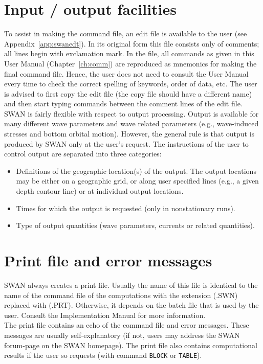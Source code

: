 \documentclass[12pt]{book}
\begin{document}
\section{Input / output facilities}
To assist in making the command file, an edit file is available to the user (see Appendix~\ref{app:swanedt}). In its original
form this file consists only of comments; all lines begin with exclamation mark. In the file, all commands
as given in this User Manual (Chapter~\ref{ch:comm}) are reproduced as mnemonics for making the final command
file. Hence, the user does not need to consult the User Manual every time to check the correct spelling
of keywords, order of data, etc. The user is advised to first copy the edit file (the copy file should have a
different name) and then start typing commands between the comment lines of the edit file.
\\[2ex]
\noindent
SWAN is fairly flexible with respect to output processing. Output is available for many different wave
parameters and wave related parameters (e.g., wave-induced stresses and bottom orbital motion).
However, the general rule is that output is produced by SWAN only at the user's request. The instructions
of the user to control output are separated into three categories:
\begin{itemize}
  \item Definitions of the geographic location(s) of the output. The output locations may be either on a
        geographic grid, or along user specified lines (e.g., a given depth contour line) or at
        individual output locations.
  \item Times for which the output is requested (only in nonstationary runs).
  \item Type of output quantities (wave parameters, currents or related quantities).
\end{itemize}

\section{Print file and error messages}
\label{sec:prtfile}
SWAN always creates a print file. Usually the name of this file is identical to the name of the command
file of the computations with the extension (.SWN) replaced with (.PRT). Otherwise, it depends on the
batch file that is used by the user. Consult the Implementation Manual for more information.
\\[2ex]
\noindent
The print file contains an echo of the command file and error messages. These messages are usually
self-explanatory (if not, users may address the SWAN forum-page on the SWAN homepage). The print
file also contains computational results if the user so requests (with command {\tt BLOCK} or {\tt TABLE}).
\end{document}
